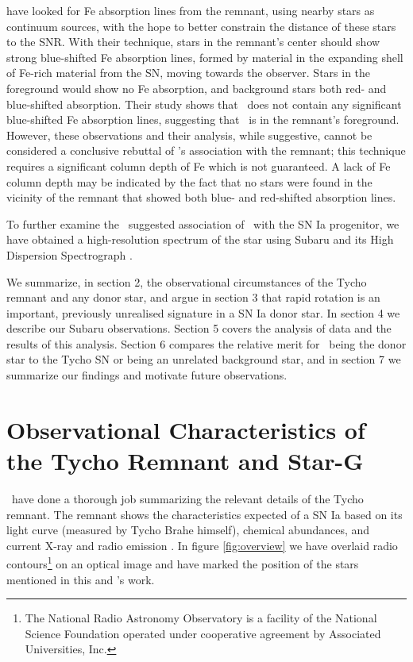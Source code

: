 \citet{2007PASJ...59..811I} have looked for Fe absorption lines from
the remnant, using nearby stars as continuum sources, with the hope to
better constrain the distance of these stars to the SNR. With their technique, stars in the
remnant's center should show strong blue-shifted Fe absorption lines,
formed by material in the expanding shell of Fe-rich material from the
SN, moving towards the observer.  Stars in the foreground would show
no Fe absorption, and background stars both red- and blue-shifted
absorption. Their study shows that \starg\ does not contain any
significant blue-shifted Fe absorption lines, suggesting that \starg\
is in the remnant's foreground. However, these observations and their
analysis, while suggestive, cannot be considered a conclusive rebuttal
of \starg's association with the remnant; this technique requires a significant column depth of Fe which is not guaranteed. A lack of Fe column depth may be indicated by the fact that no stars were found in the
vicinity of the remnant that showed both blue- and red-shifted absorption lines.

To further examine the \rl\ suggested association of \starg\ with the
SN Ia progenitor, we have obtained a high-resolution spectrum of the
star using Subaru and its High Dispersion Spectrograph
\citep{1998SPIE.3355..354N}.

We summarize, in section 2, the observational
circumstances of the Tycho remnant and any donor star, and argue in
section 3 that rapid rotation is an important, previously unrealised
signature in a SN Ia donor star. In section 4 we describe our
Subaru observations. Section 5 covers the analysis of data and the results of this analysis. Section 6 compares the relative merit for \starg\ being the donor star to the
Tycho SN or being an unrelated background star, and in section 7 we summarize our findings and motivate future observations.

\section{Observational Characteristics of the Tycho Remnant and Star-G}

\rl\ have done a thorough job summarizing the relevant details of the
Tycho remnant. The remnant shows the characteristics expected of a SN
Ia based on its light curve (measured by Tycho Brahe himself),
chemical abundances, and current X-ray and radio emission
\citep{2004ApJ...612..357R}. In figure \ref{fig:overview} we have overlaid radio contours\footnote{The National Radio Astronomy Observatory is a facility of the National Science Foundation operated under cooperative agreement by Associated Universities, Inc.}  on an optical image and have marked the position of the stars mentioned in this and \rl's work.


